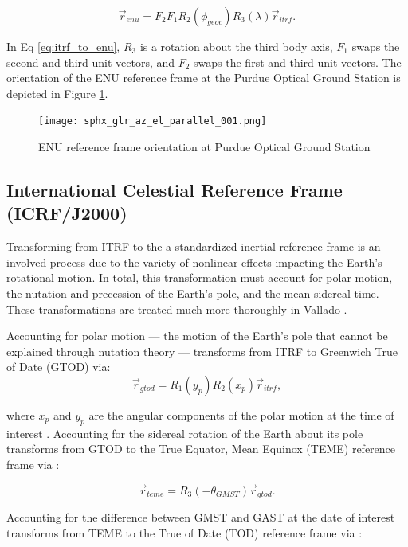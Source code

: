 \begin{equation} \label{eq:itrf_to_enu}
  \vec{r}_{enu} = F_2 F_1 R_2(\phi_{geoc}) R_3(\lambda) \vec{r}_{itrf}.
\end{equation}

In Eq \ref{eq:itrf_to_enu}, $R_3$ is a rotation about the third body axis, $F_1$ swaps the second and third unit vectors, and $F_2$ swaps the first and third unit vectors. The orientation of the ENU reference frame at the Purdue Optical Ground Station is depicted in Figure \ref{fig:pogs_enu}.

\begin{figure}[ht]
  \centering
  \texttt{[image: sphx\_glr\_az\_el\_parallel\_001.png]}
  \caption{ENU reference frame orientation at Purdue Optical Ground Station}
  \label{fig:pogs_enu}
\end{figure}

\subsection{International Celestial Reference Frame (ICRF/J2000)}

Transforming from ITRF to the a standardized inertial reference frame is an involved process due to the variety of nonlinear effects impacting the Earth's rotational motion. In total, this transformation must account for polar motion, the nutation and precession of the Earth's pole, and the mean sidereal time. These transformations are treated much more thoroughly in Vallado \cite{vallado4ed}. 

Accounting for polar motion --- the motion of the Earth's pole that cannot be explained through nutation theory --- transforms from ITRF to Greenwich True of Date (GTOD) via: 
\begin{equation} \label{eq:itrf_to_gtod}
  \vec{r}_{gtod} = R_1(y_p) R_2(x_p) \vec{r}_{itrf},
\end{equation}

where $x_p$ and $y_p$ are the angular components of the polar motion at the time of interest \cite{frueh2019notes}. Accounting for the sidereal rotation of the Earth about its pole transforms from GTOD to the True Equator, Mean Equinox (TEME) reference frame via \cite{frueh2019notes}:

\begin{equation} \label{eq:gtod_to_teme}
  \vec{r}_{teme} = R_3(-\theta_{GMST}) \vec{r}_{gtod}.
\end{equation}

Accounting for the difference between GMST and GAST at the date of interest transforms from TEME to the True of Date (TOD) reference frame via \cite{vallado4ed}:

